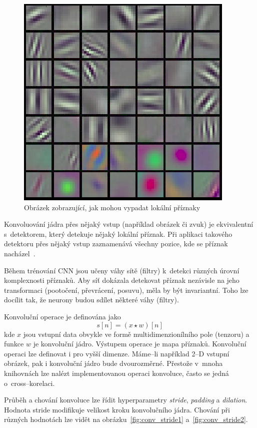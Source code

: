 \begin{figure}[H]
    \centering
    \includegraphics[scale=0.35]{obrazky-figures/features.png}
    \caption{\label{fig:features}Obrázek zobrazující, jak mohou vypadat lokální příznaky}
\end{figure}

Konvoluování jádra přes nějaký vstup (například obrázek či zvuk) je ekvivalentní s~detektorem, který detekuje nějaký lokální příznak. Při aplikaci takového detektoru přes nějaký vstup zaznamenává všechny pozice, kde se příznak nacházel~\cite{mitdeeplearning_small}.

Během trénování CNN jsou učeny váhy sítě (filtry) k~detekci různých úrovní komplexnosti příznaků. Aby síť dokázala detekovat příznak nezávisle na jeho transformaci (pootočení, převrácení, posuvu), měla by být invariantní. Toho lze docílit tak, že neurony budou sdílet některé váhy (filtry).


Konvoluční operace je definována jako
\begin{equation}
   s[n] = (x \star w)[n]
\end{equation}
kde $x$ jsou vstupní data obvykle ve formě multidimenzionílního pole (tenzoru) a funkce $w$ je konvoluční jádro. Výstupem operace je mapa příznaků. Konvoluční operaci lze definovat i pro vyšší dimenze. Máme--li například 2--D vstupní obrázek, pak i konvoluční jádro bude dvourozměrné. Přestože v~mnoha knihovnách lze nalézt implementovanou operaci konvoluce, často se jedná o~cross--korelaci.


Průběh a chování konvoluce lze řídit hyperparametry \textit{stride}, \textit{padding} a \textit{dilation}. Hodnota stride modifikuje velikost kroku konvolučního jádra. Chování při různých hodnotách lze vidět na obrázku~\ref{fig:conv_stride1} a~\ref{fig:conv_stride2}. 

